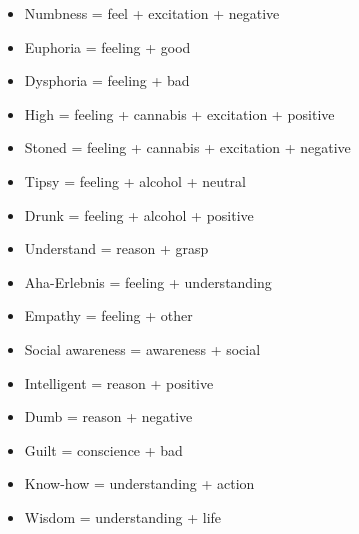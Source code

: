 \begin{itemize}
\item   Numbness = feel + excitation + negative 

\item   Euphoria = feeling + good 

\item   Dysphoria = feeling + bad 

\item   High = feeling + cannabis + excitation + positive 

\item   Stoned = feeling + cannabis + excitation + negative 

\item   Tipsy = feeling + alcohol + neutral 

\item   Drunk = feeling + alcohol + positive 

\item   Understand = reason + grasp 

\item   Aha-Erlebnis = feeling + understanding 

\item   Empathy = feeling + other 

\item   Social awareness = awareness + social 

\item   Intelligent = reason + positive 

\item   Dumb = reason + negative 

\item   Guilt = conscience + bad 

\item   Know-how = understanding + action 

\item   Wisdom = understanding + life 
\end{itemize}


